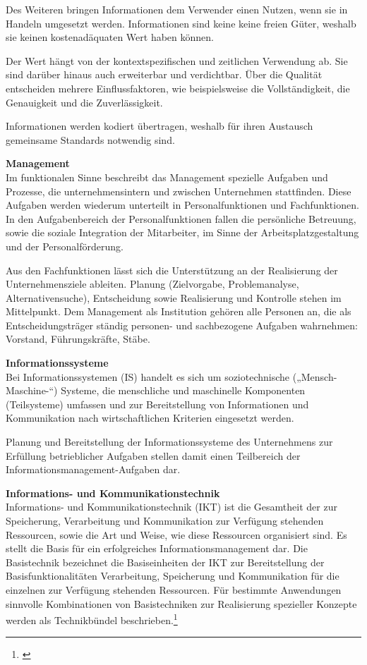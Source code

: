 Des Weiteren bringen Informationen dem Verwender einen Nutzen, wenn sie in Handeln umgesetzt werden. Informationen sind keine keine freien Güter, weshalb sie keinen kostenadäquaten Wert haben können.

Der Wert hängt von der kontextspezifischen und zeitlichen Verwendung ab. Sie sind darüber hinaus auch erweiterbar und verdichtbar. Über die Qualität entscheiden mehrere Einflussfaktoren, wie beispielsweise die Vollständigkeit, die Genauigkeit und die Zuverlässigkeit.

Informationen werden kodiert übertragen, weshalb für ihren Austausch gemeinsame Standards notwendig sind.

\textbf{Management}\\
Im funktionalen Sinne beschreibt das Management spezielle Aufgaben und Prozesse, die unternehmensintern und zwischen Unternehmen stattfinden.
Diese Aufgaben werden wiederum unterteilt in Personalfunktionen und Fachfunktionen. In den Aufgabenbereich der Personalfunktionen fallen die persönliche Betreuung, sowie die soziale Integration der Mitarbeiter, im Sinne der Arbeitsplatzgestaltung und der Personalförderung.

Aus den Fachfunktionen lässt sich die Unterstützung an der Realisierung der Unternehmensziele ableiten. Planung (Zielvorgabe, Problemanalyse, Alternativensuche), Entscheidung sowie Realisierung und Kontrolle stehen im Mittelpunkt.
Dem Management als Institution gehören alle Personen an, die als Entscheidungsträger ständig personen- und sachbezogene Aufgaben wahrnehmen: Vorstand, Führungskräfte, Stäbe.

\textbf{Informationssysteme}\\
Bei Informationssystemen (IS) handelt es sich um soziotechnische („Mensch-Maschine-“) Systeme, die menschliche und maschinelle Komponenten (Teilsysteme) umfassen und zur Bereitstellung von Informationen und Kommunikation nach wirtschaftlichen Kriterien eingesetzt werden.

Planung und Bereitstellung der Informationssysteme des Unternehmens zur Erfüllung betrieblicher Aufgaben stellen damit einen Teilbereich der Informationsmanagement-Aufgaben dar. 

\textbf{Informations- und Kommunikationstechnik}\\
Informations- und Kommunikationstechnik (IKT) ist die Gesamtheit der zur Speicherung, Verarbeitung und Kommunikation zur Verfügung stehenden Ressourcen, sowie die Art und Weise, wie diese Ressourcen organisiert sind.
Es stellt die Basis für ein erfolgreiches Informationsmanagement dar.
Die Basistechnik bezeichnet die Basiseinheiten der IKT zur Bereitstellung der Basisfunktionalitäten Verarbeitung, Speicherung und Kommunikation für die einzelnen zur Verfügung stehenden Ressourcen.
Für bestimmte Anwendungen sinnvolle Kombinationen von Basistechniken zur Realisierung spezieller Konzepte werden als Technikbündel beschrieben.\footnote{\cite{krcmar_einfuhrung_2015}}


